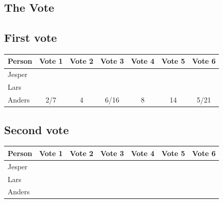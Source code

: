\documentclass[a4paper,10pt]{article}
\begin{document}
\subsection{The Vote}
\subsection{First vote}
\begin{tabular}{|l|c|c|c|c|c|c|}
\hline
Person & Vote 1 & Vote 2 & Vote 3 & Vote 4 & Vote 5 & Vote 6\\
\hline
Jesper& & & & & & \\
Lars& & & & & & \\
Anders&2/7&4&6/16&8&14&5/21\\
\hline
\end{tabular}
\subsection{Second vote}
\begin{tabular}{|l|c|c|c|c|c|c|}
\hline
Person & Vote 1 & Vote 2 & Vote 3 & Vote 4 & Vote 5 & Vote 6\\
\hline
Jesper& & & & & & \\
Lars& & & & & & \\
Anders& & & & & & \\
\hline
\end{tabular}
\end{document}
